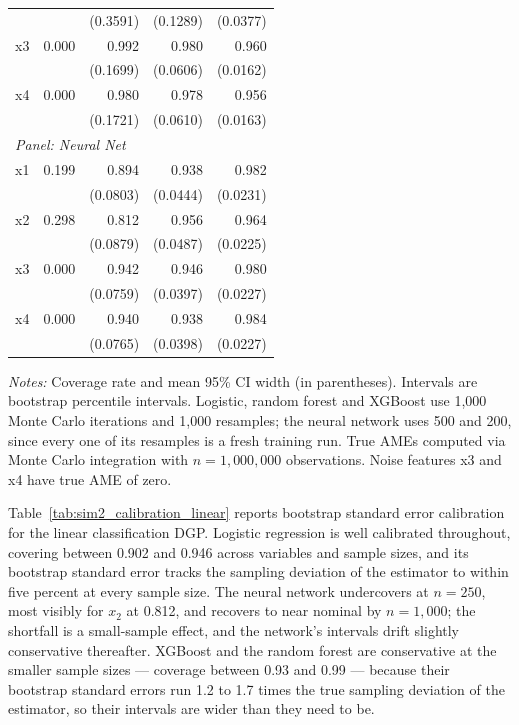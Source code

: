 \documentclass[conference]{IEEEtran}
\begin{document}
\begin{table}[htbp]
\begin{threeparttable}
\begin{tabular}{lrrrr}
				&  & (0.3591) & (0.1289) & (0.0377) \\
				\quad x3 & 0.000 & 0.992 & 0.980 & 0.960 \\
				&  & (0.1699) & (0.0606) & (0.0162) \\
				\quad x4 & 0.000 & 0.980 & 0.978 & 0.956 \\
				&  & (0.1721) & (0.0610) & (0.0163) \\
				\midrule
				\multicolumn{5}{l}{\textit{Panel: Neural Net}} \\
				\quad x1 & 0.199 & 0.894 & 0.938 & 0.982 \\
				&  & (0.0803) & (0.0444) & (0.0231) \\
				\quad x2 & 0.298 & 0.812 & 0.956 & 0.964 \\
				&  & (0.0879) & (0.0487) & (0.0225) \\
				\quad x3 & 0.000 & 0.942 & 0.946 & 0.980 \\
				&  & (0.0759) & (0.0397) & (0.0227) \\
				\quad x4 & 0.000 & 0.940 & 0.938 & 0.984 \\
				&  & (0.0765) & (0.0398) & (0.0227) \\
				\bottomrule
				\end{tabular}
				\begin{tablenotes}
				\footnotesize
				\item \textit{Notes:} Coverage rate and mean 95\% CI width (in parentheses). Intervals are bootstrap percentile intervals. Logistic, random forest and XGBoost use 1{,}000 Monte Carlo iterations and 1{,}000 resamples; the neural network uses 500 and 200, since every one of its resamples is a fresh training run. True AMEs computed via Monte Carlo integration with $n=1{,}000{,}000$ observations. Noise features x3 and x4 have true AME of zero.
				\end{tablenotes}
		\end{threeparttable}
	\end{table}
	
	Table~\ref{tab:sim2_calibration_linear} reports bootstrap standard error calibration for the linear classification DGP. Logistic regression is well calibrated throughout, covering between 0.902 and 0.946 across variables and sample sizes, and its bootstrap standard error tracks the sampling deviation of the estimator to within five percent at every sample size. The neural network undercovers at $n=250$, most visibly for $x_2$ at 0.812, and recovers to near nominal by $n=1{,}000$; the shortfall is a small-sample effect, and the network's intervals drift slightly conservative thereafter. XGBoost and the random forest are conservative at the smaller sample sizes --- coverage between 0.93 and 0.99 --- because their bootstrap standard errors run 1.2 to 1.7 times the true sampling deviation of the estimator, so their intervals are wider than they need to be.
\end{document}
